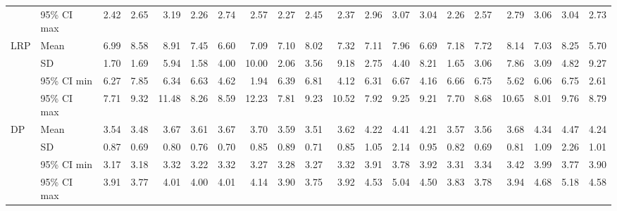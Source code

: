 \begin{longtable}{llrrrrrrrrrrrrrrrrrr}
   & 95\% CI max &       2.42 &       2.65 &       3.19 &       2.26 &       2.74 &       2.57 &       2.27 &       2.45 &       2.37 &       2.96 &       3.07 &       3.04 &       2.26 &       2.57 &       2.79 &       3.06 &       3.04 &       2.73 \\
\cline{1-20}
\multirow{4}{*}{LRP} & Mean &       6.99 &       8.58 &       8.91 &       7.45 &       6.60 &       7.09 &       7.10 &       8.02 &       7.32 &       7.11 &       7.96 &       6.69 &       7.18 &       7.72 &       8.14 &       7.03 &       8.25 &       5.70 \\
   & SD &       1.70 &       1.69 &       5.94 &       1.58 &       4.00 &      10.00 &       2.06 &       3.56 &       9.18 &       2.75 &       4.40 &       8.21 &       1.65 &       3.06 &       7.86 &       3.09 &       4.82 &       9.27 \\
   & 95\% CI min &       6.27 &       7.85 &       6.34 &       6.63 &       4.62 &       1.94 &       6.39 &       6.81 &       4.12 &       6.31 &       6.67 &       4.16 &       6.66 &       6.75 &       5.62 &       6.06 &       6.75 &       2.61 \\
   & 95\% CI max &       7.71 &       9.32 &      11.48 &       8.26 &       8.59 &      12.23 &       7.81 &       9.23 &      10.52 &       7.92 &       9.25 &       9.21 &       7.70 &       8.68 &      10.65 &       8.01 &       9.76 &       8.79 \\
\cline{1-20}
\multirow{4}{*}{DP} & Mean &       3.54 &       3.48 &       3.67 &       3.61 &       3.67 &       3.70 &       3.59 &       3.51 &       3.62 &       4.22 &       4.41 &       4.21 &       3.57 &       3.56 &       3.68 &       4.34 &       4.47 &       4.24 \\
   & SD &       0.87 &       0.69 &       0.80 &       0.76 &       0.70 &       0.85 &       0.89 &       0.71 &       0.85 &       1.05 &       2.14 &       0.95 &       0.82 &       0.69 &       0.81 &       1.09 &       2.26 &       1.01 \\
   & 95\% CI min &       3.17 &       3.18 &       3.32 &       3.22 &       3.32 &       3.27 &       3.28 &       3.27 &       3.32 &       3.91 &       3.78 &       3.92 &       3.31 &       3.34 &       3.42 &       3.99 &       3.77 &       3.90 \\
   & 95\% CI max &       3.91 &       3.77 &       4.01 &       4.00 &       4.01 &       4.14 &       3.90 &       3.75 &       3.92 &       4.53 &       5.04 &       4.50 &       3.83 &       3.78 &       3.94 &       4.68 &       5.18 &       4.58 \\
\end{longtable}
